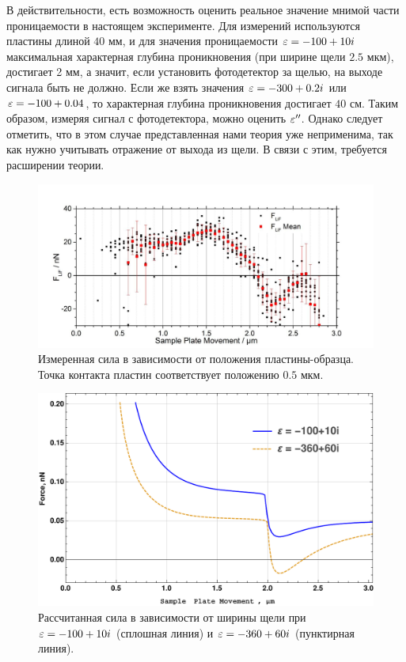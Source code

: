 В действительности, есть возможность оценить реальное значение мнимой части проницаемости в настоящем эксперименте. Для измерений используются пластины длиной $40$ мм, и для значения проницаемости $\varepsilon = -100 + 10i$ максимальная характерная глубина проникновения (при ширине щели  $2.5$ мкм),  достигает 2 мм, а значит, если установить фотодетектор за щелью, на выходе сигнала быть не должно. Если же взять значения $\varepsilon = -300 + 0.2i$ или $\varepsilon = -100+0.04$, то характерная глубина проникновения достигает $40$ см. Таким образом, измеряя сигнал с фотодетектора, можно оценить $\varepsilon''$. Однако следует отметить, что в этом случае представленная нами теория уже неприменима, так как нужно учитывать отражение от выхода из щели. В связи с этим, требуется расширении теории.

\begin{figure}
    \centering
    \includegraphics[width=\textwidth]{figures/exp_data_force.png}
    \caption{Измеренная сила в зависимости от положения пластины-образца. Точка контакта пластин соответствует положению $0.5$ мкм.}
    \label{fig:force_exp}
\end{figure}
\begin{figure}
    \centering
    \includegraphics[width=\textwidth]{figures/ForceGauss_Newton_10010_36060.pdf}
    \caption{Рассчитанная сила в зависимости от ширины щели при $\varepsilon = -100 + 10i$ (сплошная линия) и $\varepsilon = -360+60i$ (пунктирная линия).}
    \label{fig:force_N_2eps_1}
\end{figure}
